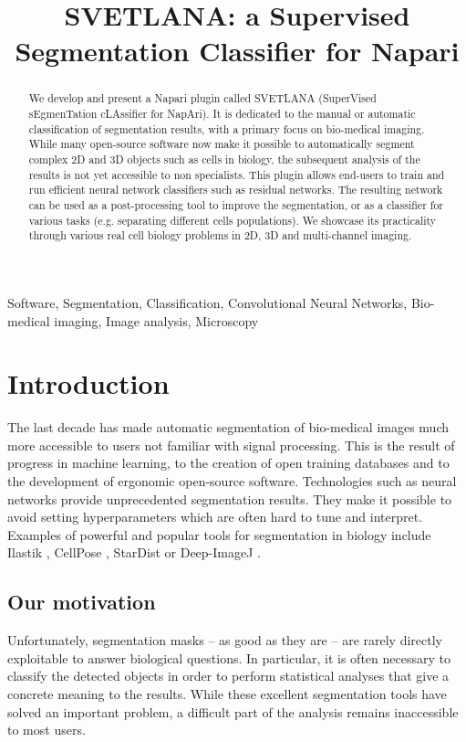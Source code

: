 \documentclass{article}
\title{SVETLANA: a Supervised Segmentation Classifier for Napari}
\begin{document}
%
\maketitle
%
\begin{abstract}
We develop and present a Napari plugin called SVETLANA (SuperVised sEgmenTation cLAssifier for NapAri). It is dedicated to the manual or automatic classification of segmentation results, with a primary focus on bio-medical imaging.
While many open-source software now make it possible to automatically segment complex 2D and 3D objects such as cells in biology, the subsequent analysis of the results is not yet accessible to non specialists. 
This plugin allows end-users to train and run efficient neural network classifiers such as residual networks. 
The resulting network can be used as a post-processing tool to improve the segmentation, or as a classifier for various tasks (e.g. separating different cells populations).
We showcase its practicality through various real cell biology problems in 2D, 3D and multi-channel imaging.
\end{abstract}
%
\begin{keywords}
Software, Segmentation, Classification, Convolutional Neural Networks, Bio-medical imaging, Image analysis, Microscopy
\end{keywords}
%
\section{Introduction}
\label{sec:intro}

The last decade has made automatic segmentation of bio-medical images much more accessible to users not familiar with signal processing. 
This is the result of progress in machine learning, to the creation of open training databases and to the development of ergonomic open-source software. Technologies such as neural networks provide unprecedented segmentation results. They make it possible to avoid setting hyperparameters which are often hard to tune and interpret. 
Examples of powerful and popular tools for segmentation in biology include Ilastik \cite{berg2019ilastik}, CellPose \cite{stringer2021cellpose}, StarDist \cite{fazeli2020automated} or Deep-ImageJ \cite{gomez2021deepimagej}. 

\subsection{Our motivation}

Unfortunately, segmentation masks -- as good as they are -- are rarely directly exploitable to answer biological questions. In particular, it is often necessary to classify the detected objects in order to perform statistical analyses that give a concrete meaning to the results. 
While these excellent segmentation tools have solved an important problem, a difficult part of the analysis remains inaccessible to most users.
\end{document}
